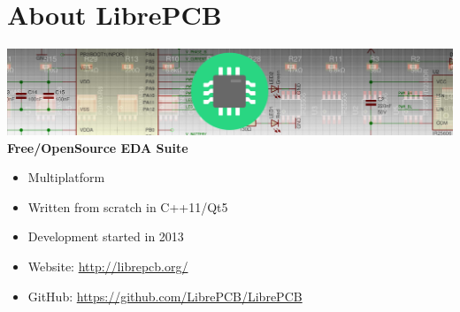 \section{About LibrePCB}

\begin{frame}{\secname}
  \includegraphics[width=\linewidth]{images/about_header.png} \linebreak\linebreak
  \textbf{Free/OpenSource EDA Suite}
  \begin{itemize}
    \item Multiplatform \faLinux\ \faWindows\ \faApple\
    \item Written from scratch in C++11/Qt5
    \item Development started in 2013
    \item Website: \url{http://librepcb.org/}
    \item GitHub: \url{https://github.com/LibrePCB/LibrePCB}
  \end{itemize}
\end{frame}
